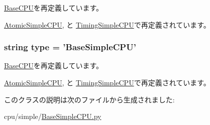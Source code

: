 \hyperlink{classBaseCPU_1_1BaseCPU_a17da7064bc5c518791f0c891eff05fda}{BaseCPU}を再定義しています。

\hyperlink{classAtomicSimpleCPU_1_1AtomicSimpleCPU_a17da7064bc5c518791f0c891eff05fda}{AtomicSimpleCPU}, と \hyperlink{classTimingSimpleCPU_1_1TimingSimpleCPU_a17da7064bc5c518791f0c891eff05fda}{TimingSimpleCPU}で再定義されています。\hypertarget{classBaseSimpleCPU_1_1BaseSimpleCPU_acce15679d830831b0bbe8ebc2a60b2ca}{
\subsubsection[{type}]{\setlength{\rightskip}{0pt plus 5cm}string {\bf type} = '{\bf BaseSimpleCPU}'}}
\label{classBaseSimpleCPU_1_1BaseSimpleCPU_acce15679d830831b0bbe8ebc2a60b2ca}


\hyperlink{classBaseCPU_1_1BaseCPU_acce15679d830831b0bbe8ebc2a60b2ca}{BaseCPU}を再定義しています。

\hyperlink{classAtomicSimpleCPU_1_1AtomicSimpleCPU_acce15679d830831b0bbe8ebc2a60b2ca}{AtomicSimpleCPU}, と \hyperlink{classTimingSimpleCPU_1_1TimingSimpleCPU_acce15679d830831b0bbe8ebc2a60b2ca}{TimingSimpleCPU}で再定義されています。

このクラスの説明は次のファイルから生成されました:\begin{DoxyCompactItemize}
\item 
cpu/simple/\hyperlink{BaseSimpleCPU_8py}{BaseSimpleCPU.py}\end{DoxyCompactItemize}
